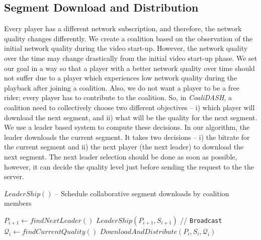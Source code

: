 \subsection{Segment Download and Distribution}
Every player has a different network subscription, and therefore, the network quality changes differently. We create a coalition based on the observation of the initial network quality during the video start-up. However, the network quality over the time may change drastically from the initial video start-up phase. We set our goal in a way so that a player with a better network quality over time should not suffer due to a player which experiences low network quality during the playback after joining a coalition. Also, we do not want a player to be a free rider; every player has to contribute to the coalition. 
So, in \textit{CoaliDASH}, a coalition need to collectively choose two different objectives -- i) which player will download the next segment, and ii) what will be the quality for the next segment. We use a leader based system to compute these decisions. In our algorithm, the leader downloads the current segment. It takes two decisions -- i) the bitrate for the current segment and ii) the next player (the next leader) to download the next segment.
The next leader selection should be done as soon as possible, however, it can decide the quality level just before sending the request to the the server.

\begin{algorithm}
	\DontPrintSemicolon
	\caption{\label{algo:leadership}$LeaderShip()$ -- Schedule collaborative segment downloads by coalition members}
	

	
	$P_{i+1} \leftarrow findNextLeader()$\;
	$LeaderShip(P_{i+1}, S_{i+1})$ \hfill // \texttt{Broadcast} \;
	$\mathcal{Q}_i \leftarrow findCurrentQuality()$\;
	$DownloadAndDistribute(P_i, S_i, \mathcal{Q}_i)$\;
\end{algorithm}


